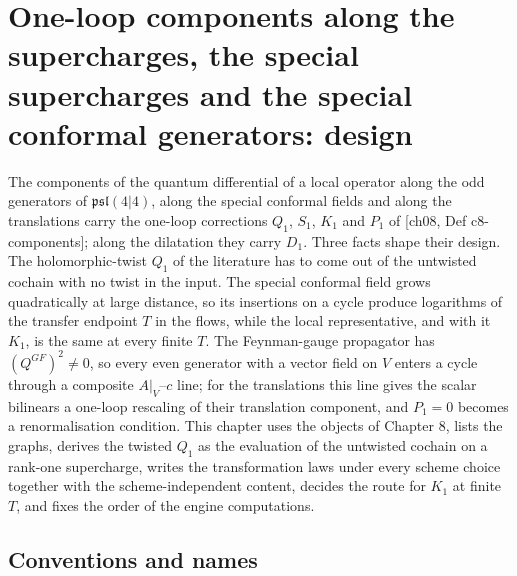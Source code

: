 \chapter{One-loop components along the supercharges, the special supercharges and the special conformal generators: design}

The components of the quantum differential of a local operator along the odd generators of $\mathfrak{psl}(4|4)$, along the special conformal fields and along the translations carry the one-loop corrections $Q_1$, $S_1$, $K_1$ and $P_1$ of [ch08, Def c8-components]; along the dilatation they carry $D_1$. Three facts shape their design. The holomorphic-twist $Q_1$ of the literature has to come out of the untwisted cochain with no twist in the input. The special conformal field grows quadratically at large distance, so its insertions on a cycle produce logarithms of the transfer endpoint $T$ in the flows, while the local representative, and with it $K_1$, is the same at every finite $T$. The Feynman-gauge propagator has $(Q^{GF})^2\neq0$, so every even generator with a vector field on $V$ enters a cycle through a composite $A|_V$--$c$ line; for the translations this line gives the scalar bilinears a one-loop rescaling of their translation component, and $P_1=0$ becomes a renormalisation condition. This chapter uses the objects of Chapter 8, lists the graphs, derives the twisted $Q_1$ as the evaluation of the untwisted cochain on a rank-one supercharge, writes the transformation laws under every scheme choice together with the scheme-independent content, decides the route for $K_1$ at finite $T$, and fixes the order of the engine computations.

\section{Conventions and names}

